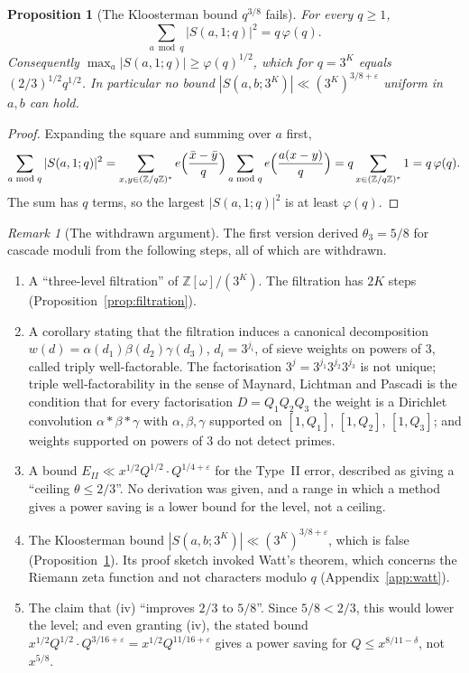\documentclass[12pt]{amsart}
\theoremstyle{plain}
\newtheorem{proposition}[theorem]{Proposition}
\theoremstyle{definition}
\theoremstyle{remark}
\newtheorem{remark}[theorem]{Remark}
\newcommand{\Z}{\mathbb{Z}}
\newcommand{\Zomega}{\Z[\omega]}
\begin{document}
\begin{proposition}[The Kloosterman bound $q^{3/8}$ fails]
\label{prop:kloosterman}
For every $q \geq 1$,
\[
  \sum_{a \bmod q} |S(a, 1; q)|^2 = q\,\varphi(q).
\]
Consequently $\max_{a} |S(a, 1; q)| \geq \varphi(q)^{1/2}$, which for $q = 3^K$
equals $(2/3)^{1/2} q^{1/2}$. In particular no bound
$|S(a, b; 3^K)| \ll (3^K)^{3/8 + \varepsilon}$ uniform in $a, b$ can hold.
\end{proposition}

\begin{proof}
Expanding the square and summing over $a$ first,
\[
  \sum_{a \bmod q} |S(a,1;q)|^2
  = \sum_{x, y \in (\Z/q\Z)^*} e\Bigl(\frac{\bar{x} - \bar{y}}{q}\Bigr)
    \sum_{a \bmod q} e\Bigl(\frac{a(x-y)}{q}\Bigr)
  = q \sum_{x \in (\Z/q\Z)^*} 1 = q\,\varphi(q).
\]
The sum has $q$ terms, so the largest $|S(a,1;q)|^2$ is at least
$\varphi(q)$.
\end{proof}

\begin{remark}[The withdrawn argument]
\label{rem:withdrawn}
The first version derived $\theta_3 = 5/8$ for cascade moduli from the following
steps, all of which are withdrawn.
\begin{enumerate}[label=(\roman*)]
  \item A ``three-level filtration'' of $\Zomega/(3^K)$. The filtration has
    $2K$ steps (Proposition~\ref{prop:filtration}).
  \item A corollary stating that the filtration induces a canonical
    decomposition $w(d) = \alpha(d_1)\beta(d_2)\gamma(d_3)$, $d_i = 3^{j_i}$, of
    sieve weights on powers of $3$, called triply well-factorable. The
    factorisation $3^j = 3^{j_1}3^{j_2}3^{j_3}$ is not unique; triple
    well-factorability in the sense of Maynard, Lichtman and Pascadi is the
    condition that for every factorisation $D = Q_1Q_2Q_3$ the weight is a
    Dirichlet convolution $\alpha * \beta * \gamma$ with $\alpha, \beta, \gamma$
    supported on $[1,Q_1]$, $[1,Q_2]$, $[1,Q_3]$; and weights supported on powers
    of $3$ do not detect primes.
  \item A bound $E_{II} \ll x^{1/2}Q^{1/2} \cdot Q^{1/4+\varepsilon}$ for the
    Type~II error, described as giving a ``ceiling $\theta \leq 2/3$''. No
    derivation was given, and a range in which a method gives a power saving is
    a lower bound for the level, not a ceiling.
  \item The Kloosterman bound $|S(a,b;3^K)| \ll (3^K)^{3/8+\varepsilon}$, which
    is false (Proposition~\ref{prop:kloosterman}). Its proof sketch invoked
    Watt's theorem, which concerns the Riemann zeta function and not characters
    modulo $q$ (Appendix~\ref{app:watt}).
  \item The claim that (iv) ``improves $2/3$ to $5/8$''. Since $5/8 < 2/3$, this
    would lower the level; and even granting (iv), the stated bound
    $x^{1/2}Q^{1/2} \cdot Q^{3/16+\varepsilon} = x^{1/2}Q^{11/16+\varepsilon}$
    gives a power saving for $Q \leq x^{8/11-\delta}$, not $x^{5/8}$.
\end{enumerate}
\end{remark}
\end{document}
